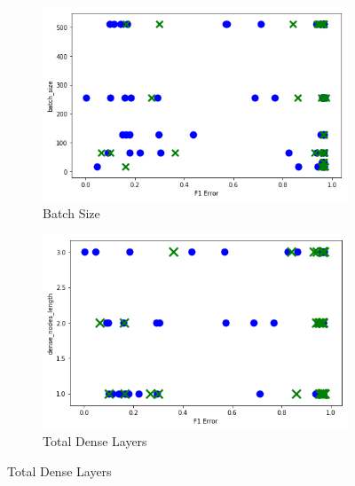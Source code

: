 \begin{figure}[H]
     \begin{subfigure}[b]{0.49\textwidth}
         \centering
         \includegraphics[width=\textwidth]{images/batch_size_dummy.png}
         \caption{Batch Size}
         \label{fig:batch_size_learning}
     \end{subfigure}
     \hfill
     \begin{subfigure}[b]{0.49\textwidth}
         \centering
         \includegraphics[width=\textwidth]{images/dense_layers_total_dummy.png}
         \caption{Total Dense Layers}
         \label{fig:dense_layers_learning}
     \end{subfigure}


\end{figure}
